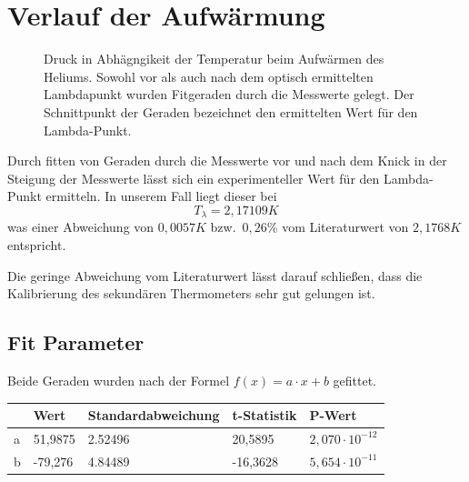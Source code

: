 \documentclass[bigchapter,colorback,accentcolor=tud4b,linedtoc,11pt]{tudreport}
\begin{document}
\section{Verlauf der Aufwärmung}
\begin{figure}[H]
    \caption{Druck in Abhägngikeit der Temperatur beim Aufwärmen des
      Heliums. Sowohl vor als auch nach dem optisch ermittelten Lambdapunkt
      wurden Fitgeraden durch die Messwerte gelegt. Der Schnittpunkt der Geraden
      bezeichnet den ermittelten Wert für den Lambda-Punkt.}
\end{figure}

Durch fitten von Geraden durch die Messwerte vor und nach dem Knick in der
Steigung der Messwerte lässt sich ein experimenteller Wert für den Lambda-Punkt
ermitteln. In unserem Fall liegt dieser bei 
$$T_{\lambda}=2,17109K$$
was einer Abweichung von $0,0057K$ bzw.\ $0,26\%$ vom Literaturwert von
$2,1768K$ entspricht.

Die geringe Abweichung vom Literaturwert lässt darauf schließen, dass die
Kalibrierung des sekundären Thermometers sehr gut gelungen ist.

\subsection{Fit Parameter}
Beide Geraden wurden nach der Formel $f(x) = a \cdot x + b$ gefittet.
\begin{center}
  \begin{tabular}{l|llll}
      & Wert & Standardabweichung & t-Statistik & P-Wert                \\ \hline
    a & 51,9875  & 2.52496        & 20,5895     & $2,070 \cdot 10^{-12}$ \\
    b & -79,276  & 4.84489        & -16,3628    & $5,654 \cdot 10^{-11}$ \\
  \end{tabular}
\end{center}
\end{document}
